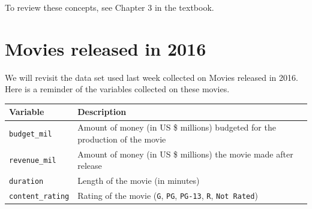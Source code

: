 \documentclass[
]{report}
\begin{document}
To review these concepts, see Chapter 3 in the textbook.

\hypertarget{movies-released-in-2016}{%
\section{Movies released in 2016}\label{movies-released-in-2016}}

We will revisit the data set used last week collected on Movies released in 2016. Here is a reminder of the variables collected on these movies.

\begin{longtable}[]{@{}ll@{}}
\toprule
\begin{minipage}[b]{0.22\columnwidth}\raggedright
\textbf{Variable}\strut
\end{minipage} & \begin{minipage}[b]{0.72\columnwidth}\raggedright
\textbf{Description}\strut
\end{minipage}\tabularnewline
\midrule
\endhead
\begin{minipage}[t]{0.22\columnwidth}\raggedright
\texttt{budget\_mil}\strut
\end{minipage} & \begin{minipage}[t]{0.72\columnwidth}\raggedright
Amount of money (in US \$ millions) budgeted for the production of the movie\strut
\end{minipage}\tabularnewline
\begin{minipage}[t]{0.22\columnwidth}\raggedright
\texttt{revenue\_mil}\strut
\end{minipage} & \begin{minipage}[t]{0.72\columnwidth}\raggedright
Amount of money (in US \$ millions) the movie made after release\strut
\end{minipage}\tabularnewline
\begin{minipage}[t]{0.22\columnwidth}\raggedright
\texttt{duration}\strut
\end{minipage} & \begin{minipage}[t]{0.72\columnwidth}\raggedright
Length of the movie (in minutes)\strut
\end{minipage}\tabularnewline
\begin{minipage}[t]{0.22\columnwidth}\raggedright
\texttt{content\_rating}\strut
\end{minipage} & \begin{minipage}[t]{0.72\columnwidth}\raggedright
Rating of the movie (\texttt{G}, \texttt{PG}, \texttt{PG-13}, \texttt{R}, \texttt{Not\ Rated})\strut

\end{minipage}
\end{longtable}
\end{document}
